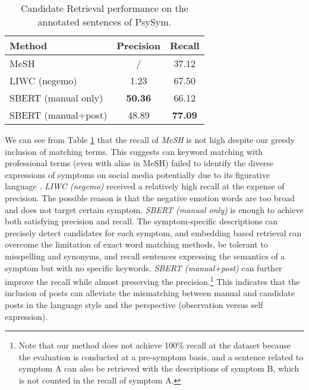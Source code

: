 \begin{table}[h]
  \small
    \centering
    \begin{tabular}{lcc}
    \hline
    Method                 & Precision   & Recall    \\ 
    \hline
    MeSH                   & / & 37.12 \\
    LIWC (negemo)          & 1.23 & 67.50 \\
    \hline
    SBERT (manual only)    & \textbf{50.36} & 66.12 \\
    SBERT (manual+post)    & 48.89 & \textbf{77.09} \\
    \hline
    \end{tabular}
    \caption{Candidate Retrieval performance on the annotated sentences of PsySym.}
    \label{tab:cand_retrieve}
\end{table}

We can see from Table \ref{tab:cand_retrieve} that the recall of \textit{MeSH} is not high despite our greedy inclusion of matching terms. This suggests can keyword matching with professional terms (even with alias in MeSH) failed to identify the diverse expressions of symptoms on social media potentially due to its figurative language \citep{yadav2020identifying}. \textit{LIWC (negemo)} received a relatively high recall at the expense of precision. The possible reason is that the negative emotion words are too broad and does not target certain symptom. \textit{SBERT (manual only)} is enough to achieve both satisfying precision and recall. The symptom-specific descriptions can precisely detect candidates for each symptom, and embedding based retrieval can overcome the limitation of exact word matching methods, be tolerant to misspelling and synonyms, and recall sentences expressing the semantics of a symptom but with no specific keywords. \textit{SBERT (manual+post)} can further improve the recall while almost preserving the precision.\footnote{Note that our method does not achieve 100\% recall at the dataset because the evaluation is conducted at a pre-symptom basis, and a sentence related to symptom A can also be retrieved with the descriptions of symptom B, which is not counted in the recall of symptom A.} This indicates that the inclusion of posts can alleviate the mismatching between manual and candidate posts in the language style and the perspective (observation versus self expression). 